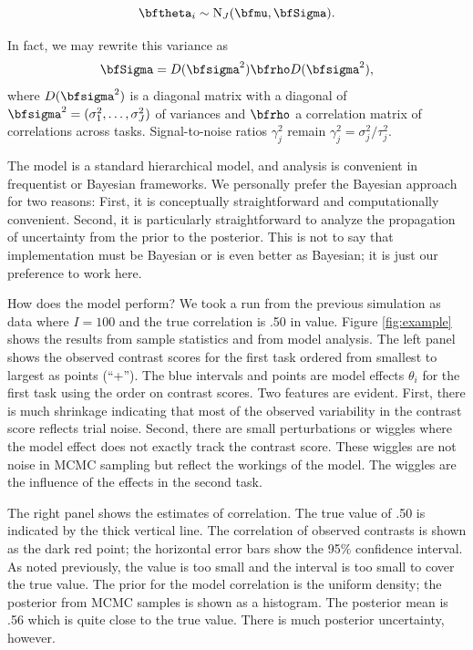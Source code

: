 \documentclass[
  ,man]{apa6}
\begin{document}
\[
\bftheta_i \sim \mbox{N}_J(\bfmu,\bfSigma).
\]

In fact, we may rewrite this variance as
\[
\bfSigma=D(\bfsigma^2)\bfrho D(\bfsigma^2),
\]
where \(D(\bfsigma^2)\) is a diagonal matrix with a diagonal of \(\bfsigma^2=(\sigma_1^2,\ldots,\sigma_J^2)\) of variances and \(\bfrho\) a correlation matrix of correlations across tasks. Signal-to-noise ratios \(\gamma^2_j\) remain \(\gamma^2_j = \sigma^2_j/\tau^2_j\).

The model is a standard hierarchical model, and analysis is convenient in frequentist or Bayesian frameworks. We personally prefer the Bayesian approach for two reasons: First, it is conceptually straightforward and computationally convenient. Second, it is particularly straightforward to analyze the propagation of uncertainty from the prior to the posterior. This is not to say that implementation must be Bayesian or is even better as Bayesian; it is just our preference to work here.

How does the model perform? We took a run from the previous simulation as data where \(I=100\) and the true correlation is .50 in value. Figure \ref{fig:example} shows the results from sample statistics and from model analysis. The left panel shows the observed contrast scores for the first task ordered from smallest to largest as points (``+''). The blue intervals and points are model effects \(\theta_i\) for the first task using the order on contrast scores. Two features are evident. First, there is much shrinkage indicating that most of the observed variability in the contrast score reflects trial noise. Second, there are small perturbations or wiggles where the model effect does not exactly track the contrast score. These wiggles are not noise in MCMC sampling but reflect the workings of the model. The wiggles are the influence of the effects in the second task.

The right panel shows the estimates of correlation. The true value of .50 is indicated by the thick vertical line. The correlation of observed contrasts is shown as the dark red point; the horizontal error bars show the 95\% confidence interval. As noted previously, the value is too small and the interval is too small to cover the true value. The prior for the model correlation is the uniform density; the posterior from MCMC samples is shown as a histogram. The posterior mean is .56 which is quite close to the true value. There is much posterior uncertainty, however.
\end{document}

